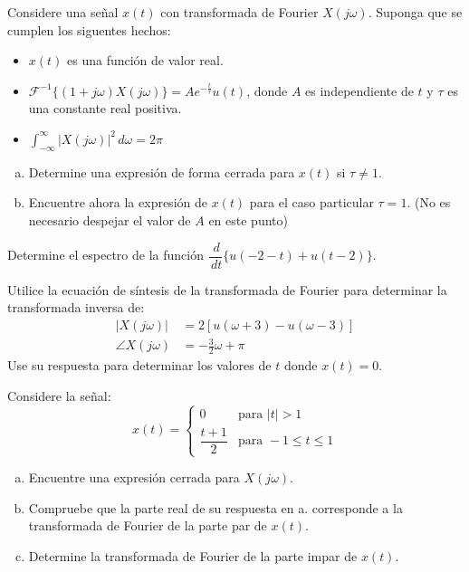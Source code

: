 \begin{ejercicio}
    Considere una señal $x(t)$ con transformada de Fourier $X(j\omega)$. Suponga que se cumplen los siguentes hechos:
    \begin{itemize}
        \item $x(t)$ es una función de valor real.
        \item $\mathscr{F}^{-1}\{(1+j\omega)X(j\omega)\} = Ae^{-\frac{t}{\tau}} u(t)$, donde $A$ es independiente de $t$ y $\tau$ es una constante real positiva.
        \item $\displaystyle\int_{-\infty}^{\infty}|X(j\omega)|^2\,d\omega=2\pi$
    \end{itemize}
    \begin{enumerate}[a.]
        \item Determine una expresión de forma cerrada para $x(t)$ si $\tau\neq 1$.
        \item Encuentre ahora la expresión de $x(t)$ para el caso particular $\tau=1$. (No es necesario despejar el valor de $A$ en este punto)
    \end{enumerate}
\end{ejercicio}

\begin{ejercicio}
    Determine el espectro de la función $\dfrac{\,d}{\,dt}\{u(-2-t)+u(t-2)\}$.
\end{ejercicio}

\begin{ejercicio}
    Utilice la ecuación de síntesis de la transformada de Fourier para determinar la transformada inversa de:
    \begin{align*}
        |X(j\omega)| &= 2[u(\omega+3)-u(\omega-3)] \\
        \angle{X(j\omega)} &= -\frac{3}{2}\omega + \pi
    \end{align*}
    Use su respuesta para determinar los valores de $t$ donde $x(t)=0$.
\end{ejercicio}

\begin{ejercicio}
    Considere la señal:
        $$ x(t) = \left\{
            \begin{array}{ll}
                0 & \text{para~} |t|>1\\[5pt]
                \dfrac{t+1}{2} & \text{para~} -1 \leq t \leq 1
            \end{array}
        \right.
        $$
    \begin{enumerate}[a.]
        \item Encuentre una expresión cerrada para $X(j\omega)$.
        \item Compruebe que la parte real de su respuesta en a. corresponde a la transformada de Fourier de la parte par de $x(t)$.
        \item Determine la transformada de Fourier de la parte impar de $x(t)$.
    \end{enumerate}
\end{ejercicio}


